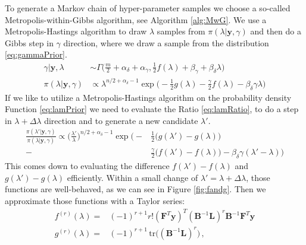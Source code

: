 To generate a Markov chain of hyper-parameter samples we choose a so-called Metropolis-within-Gibbs algorithm, see Algorithm \ref{alg:MwG}.
We use a Metropolis-Hastings algorithm to draw $\lambda$ samples from $\pi(\lambda |  \bm{y}, \gamma )$ and then do a Gibbs step in $\gamma$ direction, where we draw a sample from the distribution \ref{eq:gammaPrior}.
\begin{subequations}
\begin{align}
    \label{eq:gammaPrior}
     \gamma |  \bm{y}, \lambda &\sim \Gamma \bigg( \frac{m}{2} + \alpha_\delta + \alpha_\gamma, \frac{1}{2} f (\lambda ) + \beta_\gamma + \beta_\delta \lambda \bigg)\\
     \label{eq:lamPrior}
     \pi(\lambda | \bm{y}, \gamma) &\propto \lambda^{n/2+\alpha_\delta -1} \exp{\bigg( - \frac{1}{2} g ( \lambda) - \frac{\gamma}{2} f ( \lambda) - \beta_\delta \gamma \lambda \bigg)}
\end{align} 
\end{subequations}
If we like to utilize a Metropolis-Hastings algorithm on the probability density Function \ref{eq:lamPrior} we need to evaluate the Ratio \ref{eq:lamRatio}, to do a step in $\lambda + \Delta \lambda $ direction and to generate a new candidate $\lambda'$.
\begin{align}
\label{eq:lamRatio}
    \frac{\pi(\lambda' |  \bm{y}, \gamma ) }{\pi(\lambda |  \bm{y}, \gamma) } \propto \bigg(\frac{\lambda'}{\lambda}\bigg)^{n/2+\alpha_\delta -1} \exp \bigg( -& \frac{1}{2} \big(  g ( \lambda') - g ( \lambda) \big) \\  -& \frac{\gamma}{2} \big( f ( \lambda') - f ( \lambda) \big)- \beta_\delta \gamma (\lambda' - \lambda) \bigg)
\end{align}
This comes down to evaluating the difference $f ( \lambda') - f ( \lambda)$ and $g ( \lambda') - g ( \lambda) $ efficiently.
Within a small change of $\lambda' = \lambda + \Delta \lambda$, those functions are well-behaved, as we can see in Figure \ref{fig:fandg}.
Then we approximate those functions with a Taylor series:
\begin{align}
    f^{(r)} (\lambda)=& (-1)^{r+1} r! (\bm{F}^T \bm{y})^T (\bm{B}^{-1} \bm{L})^r \bm{B}^{-1} \bm{F}^T \bm{y} \label{eq:ftay} \\
    g^{(r)} ( \lambda) =&  (-1)^{r+1} \, \text{tr} \big( (\bm{B}^{-1}\bm{ L })^r \big) \, ,
   \label{eq:gtay}
\end{align} 

